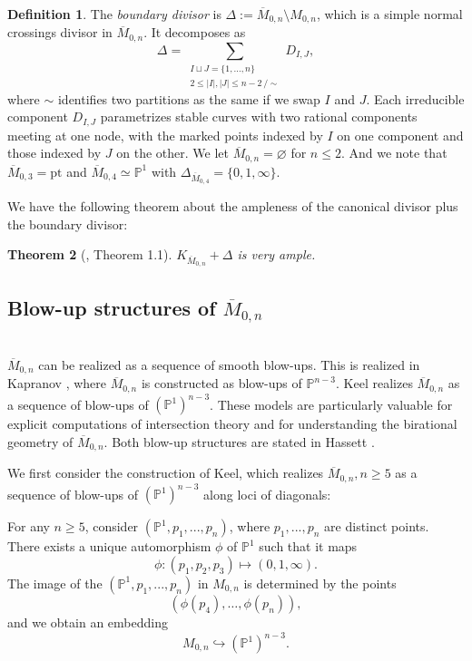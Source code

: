 \documentclass{amsart}
\newtheorem{theorem}{Theorem}[section]
\theoremstyle{definition}
\newtheorem{definition}[theorem]{Definition}
\theoremstyle{remark}
\begin{document}
\begin{definition}
The \emph{boundary divisor} is \(\Delta := \overline{M}_{0,n} \setminus M_{0,n}\), which is a simple normal crossings divisor in $\overline{M}_{0,n}$.
It decomposes as \[\Delta = \sum_{\substack{I \sqcup J = \{1, \ldots, n\} \\ 2 \le |I|, |J| \le n-2 \, / \sim}} D_{I,J},
\]
where $\sim$ identifies two partitions as the same if we swap $I$ and $J$. Each irreducible component \(D_{I,J}\) parametrizes stable curves with two rational components meeting at one node, with the marked points indexed by \(I\) on one component and those indexed by \(J\) on the other.
We let \(\overline{M}_{0,n}=\varnothing\) for \(n\le 2\). And we note that \(\overline{M}_{0,3}=\mathrm{pt}\) and \(\overline{M}_{0,4}\simeq \mathbb{P}^1\) with \(\Delta_{\overline{M}_{0,4}}=\{0,1,\infty\}\).
\end{definition}
We have the following theorem about the ampleness of the canonical divisor plus the boundary divisor:
\begin{theorem}[\cite{keel2005equationsbarm0n}, Theorem 1.1]
$K_{\overline{M}_{0,n}}+\Delta$ is very ample.
\end{theorem}

\subsection{Blow-up structures of $\overline{M}_{0,n}$}\mbox{}\\
$\overline{M}_{0,n}$ can be realized as a sequence of smooth blow-ups. This is realized in Kapranov \cite{kapranov1992chowquotientsgrassmanniani}, where $\overline{M}_{0,n}$ is constructed as blow-ups of $\mathbb{P}^{n-3}$. Keel \cite{keel1992intersection} realizes $\overline{M}_{0,n}$ as a sequence of blow-ups of $(\mathbb{P}^1)^{n-3}$. These models are particularly valuable for explicit computations of intersection theory and for understanding the birational geometry of $\overline{M}_{0,n}$. Both blow-up structures are stated in Hassett \cite{hassett2002modulispacesweightedpointed}.

\vspace{0.5cm}

We first consider the construction of Keel, which realizes $\overline{M}_{0,n}, n\geq 5$ as a sequence of blow-ups of $(\mathbb P^1)^{n-3}$ along loci of diagonals: 

For any $n\geq 5$, consider $(\mathbb P^1, p_1,...,p_n)$, where $p_1,...,p_n$ are distinct points. There exists a unique automorphism $\phi$ of $\mathbb P^1$ such that it maps 
$$ \phi: (p_1,p_2,p_3) \mapsto (0,1,\infty).$$
The image of the $(\mathbb P^1, p_1,...,p_n)$ in $M_{0,n}$ is determined by the points
\[
(\phi(p_4),\ldots,\phi(p_n)),
\]
and we obtain an embedding
\[
M_{0,n} \hookrightarrow (\mathbb{P}^1)^{n-3}.
\]
\end{document}
